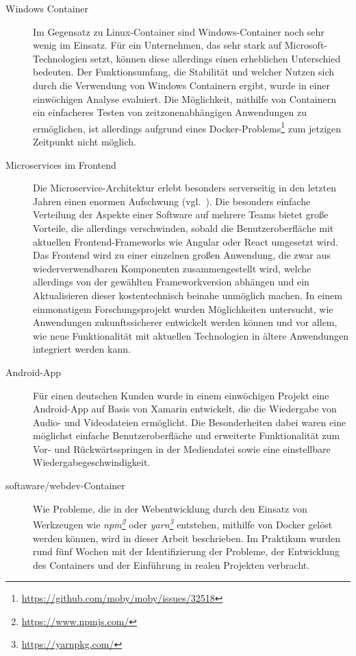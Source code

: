 \begin{description}
    \item [Windows Container]
    Im Gegensatz zu Linux-Container sind Windows-Container noch sehr wenig im Einsatz.
    Für ein Unternehmen, das sehr stark auf Microsoft-Tech\-no\-lo\-gien setzt, können diese allerdings einen erheblichen Unterschied bedeuten.
    Der Funktionsumfang, die Stabilität und welcher Nutzen sich durch die Verwendung von Windows Containern ergibt, wurde in einer einwöchigen Analyse evaluiert.
    Die Möglichkeit, mithilfe von Containern ein einfacheres Testen von zeitzonenabhängigen Anwendungen zu ermöglichen, ist allerdings aufgrund eines Docker-Problems\footnote{\url{https://github.com/moby/moby/issues/32518}} zum jetzigen Zeitpunkt nicht möglich.
    \item [Microservices im Frontend]
    Die Microservice-Architektur erlebt besonders serverseitig in den letzten Jahren einen enormen Aufschwung (vgl.~\autocite{Fowler.Microservices:online}).
    Die besonders einfache Verteilung der Aspekte einer Software auf mehrere Teams bietet große Vorteile, die allerdings verschwinden, sobald die Benutzeroberfläche mit aktuellen Frontend-Frameworks wie Angular oder React umgesetzt wird.
    Das Frontend wird zu einer einzelnen großen Anwendung, die zwar aus wiederverwendbaren Komponenten zusammengestellt wird, welche allerdings von der gewählten Frameworkversion abhängen und ein Aktualisieren dieser kostentechnisch beinahe unmöglich machen.
    In einem einmonatigem Forschungsprojekt wurden Möglichkeiten untersucht, wie Anwendungen zukunftssicherer entwickelt werden können und vor allem, wie neue Funktionalität mit aktuellen Technologien in ältere Anwendungen integriert werden kann.
    \item [Android-App]
    Für einen deutschen Kunden wurde in einem einwöchigen Projekt eine Android-App auf Basis von Xamarin entwickelt, die die Wiedergabe von Audio- und Videodateien ermöglicht.
    Die Besonderheiten dabei waren eine möglichst einfache Benutzeroberfläche und erweiterte Funktionalität zum Vor- und Rückwärtsspringen in der Mediendatei sowie eine einstellbare Wiedergabegeschwindigkeit.
    \item [softaware/webdev-Container]
    Wie Probleme, die in der Webentwicklung durch den Einsatz von Werkzeugen wie \emph{npm\footnote{\url{https://www.npmjs.com/}}} oder \emph{yarn\footnote{\url{https://yarnpkg.com/}}} entstehen, mithilfe von Docker gelöst werden können, wird in dieser Arbeit beschrieben.
    Im Praktikum wurden rund fünf Wochen mit der Identifizierung der Probleme, der Entwicklung des Containers und der Einführung in realen Projekten verbracht.
\end{description}
